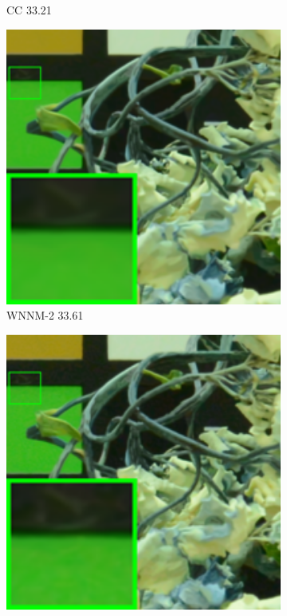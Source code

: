 \begin{figure}
\begin{subfigure}[t]{0.19\textwidth}
		\caption{CC 33.21}
    \end{subfigure}
    \hfill
    \begin{subfigure}[t]{0.19\textwidth}
        \centering
        \includegraphics[width=1\textwidth]{images/mcwnnm/cc/resize_br_WNNMJ_CC15_d800_iso6400_2.png}
		\caption{WNNM-2 33.61}
    \end{subfigure}
    \hfill
    \begin{subfigure}[t]{0.19\textwidth}
        \centering
        \includegraphics[width=1\textwidth]{images/mcwnnm/cc/resize_br_WNNM_ADMM_NL_CC15_d800_iso6400_2.png}

\end{subfigure}
\end{figure}
